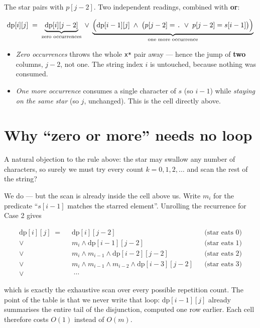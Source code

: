 \documentclass[11pt,a4paper]{article}
\begin{document}
The star pairs with $p[j-2]$. Two independent readings, combined with \textbf{or}:

\[
  \mathrm{dp}[i][j] \;=\;
  \underbrace{\mathrm{dp}[i][j-2]}_{\text{zero occurrences}}
  \;\vee\;
  \underbrace{\Bigl(\mathrm{dp}[i-1][j] \;\wedge\;
    \bigl(p[j-2] = \texttt{.} \;\vee\; p[j-2] = s[i-1]\bigr)\Bigr)}_{\text{one more occurrence}}
\]

\begin{itemize}
  \item \emph{Zero occurrences} throws the whole \texttt{x*} pair away --- hence the jump of
        \textbf{two} columns, $j-2$, not one. The string index $i$ is untouched, because nothing
        was consumed.
  \item \emph{One more occurrence} consumes a single character of $s$ (so $i-1$) while
        \emph{staying on the same star} (so $j$, unchanged). This is the cell directly above.
\end{itemize}

\section{Why ``zero or more'' needs no loop}

A natural objection to the rule above: the star may swallow any number of characters, so surely we
must try every count $k = 0, 1, 2, \dots$ and scan the rest of the string?

We do --- but the scan is already inside the cell above us. Write $m_i$ for the predicate
``$s[i-1]$ matches the starred element''. Unrolling the recurrence for Case 2 gives

\[
\begin{aligned}
  \mathrm{dp}[i][j] \;=\;& \;\mathrm{dp}[i][j-2]
    &&\text{(star eats 0)}\\
  \vee\;& \; m_i \wedge \mathrm{dp}[i-1][j-2]
    &&\text{(star eats 1)}\\
  \vee\;& \; m_i \wedge m_{i-1} \wedge \mathrm{dp}[i-2][j-2]
    &&\text{(star eats 2)}\\
  \vee\;& \; m_i \wedge m_{i-1} \wedge m_{i-2} \wedge \mathrm{dp}[i-3][j-2]
    &&\text{(star eats 3)}\\
  \vee\;& \;\;\cdots
\end{aligned}
\]

which is exactly the exhaustive scan over every possible repetition count. The point of the table
is that we never write that loop: $\mathrm{dp}[i-1][j]$ already summarises the entire tail of the
disjunction, computed one row earlier. Each cell therefore costs $O(1)$ instead of $O(m)$.
\end{document}
